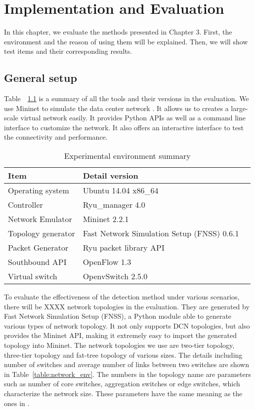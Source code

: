 \chapter{Implementation and Evaluation}
In this chapter, we evaluate the methods presented in Chapter 3. First, the environment and the reason of using them will be explained. Then, we will show test items and their corresponding results.

\section{General setup}
Table~~\ref{table:Experiment_table} is a summary of all the tools and their versions in the evaluation. We use Mininet to simulate the data center network \cite{Mininet}. It allows us to creates a large-scale virtual network easily. It provides Python APIs as well as a command line interface to customize the network. It also offers an interactive interface to test the connectivity and performance.

\begin{table}[H]
\centering
\caption{Experimental environment summary}
\begin{tabular}{|l|p{4cm}|p{4.5cm}}
\hline Item & Detail version \\
\hline
\hline Operating system & Ubuntu 14.04 x86\_64 \\
\hline Controller & Ryu\_manager 4.0 \\
\hline Network Emulator & Mininet 2.2.1 \\
\hline Topology generator & Fast Network Simulation Setup (FNSS) 0.6.1\\
\hline Packet Generator & Ryu packet library API \\
\hline Southbound API & OpenFlow 1.3 \\
\hline Virtual switch & OpenvSwitch 2.5.0 \\
\hline 
\end{tabular}
\label{table:Experiment_table}
\end{table}

To evaluate the effectiveness of the detection method under various scenarios, there will be XXXX network topologies in the evaluation. They are generated by Fast Network Simulation Setup (FNSS), a Python module able to generate various types of network topology. It not only supports DCN topologies, but also provides the Mininet API, making it extremely easy to import the generated topology into Mininet. The network topologies we use are two-tier topology, three-tier topology and fat-tree topology of various sizes. The details including number of switches and average number of links between two switches are shown in Table~\ref{table:network_env}. The numbers in the topology name are parameters such as number of core switches, aggregation switches or edge switches, which characterize the network size. These parameters have the same meaning as the ones in \cite{FNSS}.

